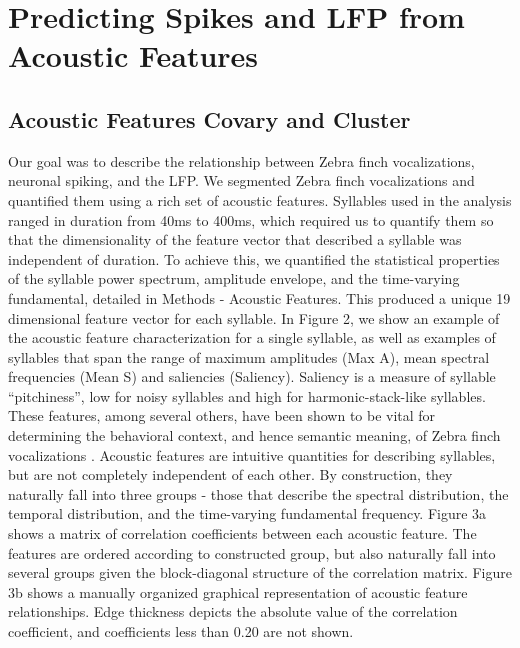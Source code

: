 \chapter{Predicting Spikes and LFP from Acoustic Features}

\section{Acoustic Features Covary and Cluster}

Our goal was to describe the relationship between Zebra finch vocalizations, neuronal spiking, and the LFP. We segmented Zebra finch vocalizations and quantified them using a rich set of acoustic features. Syllables used in the analysis ranged in duration from 40ms to 400ms, which required us to quantify them so that the dimensionality of the feature vector that described a syllable was independent of duration. To achieve this, we quantified the statistical properties of the syllable power spectrum, amplitude envelope, and the time-varying fundamental, detailed in Methods - Acoustic Features. This produced a unique 19 dimensional feature vector for each syllable.
    In Figure 2, we show an example of the acoustic feature characterization for a single syllable, as well as examples of syllables that span the range of maximum amplitudes (Max A), mean spectral frequencies (Mean S) and saliencies (Saliency). Saliency is a measure of syllable “pitchiness”, low for noisy syllables and high for harmonic-stack-like syllables. These features, among several others, have been shown to be vital for determining the behavioral context, and hence semantic meaning, of Zebra finch vocalizations \cite{Elie2015b}.
    Acoustic features are intuitive quantities for describing syllables, but are not completely independent of each other. By construction, they naturally fall into three groups - those that describe the spectral distribution, the temporal distribution, and the time-varying fundamental frequency. Figure 3a shows a matrix of correlation coefficients between each acoustic feature. The features are ordered according to constructed group, but also naturally fall into several groups given the block-diagonal structure of the correlation matrix. Figure 3b shows a manually organized graphical representation of acoustic feature relationships. Edge thickness depicts the absolute value of the correlation coefficient, and coefficients less than 0.20 are not shown.
